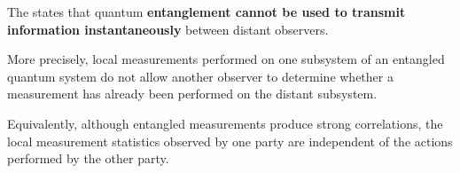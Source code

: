 \begin{definitionbox}
    The  states that quantum \textbf{entanglement cannot be used to transmit information instantaneously} between distant observers.

    \highspace
    More precisely, local measurements performed on one subsystem of an entangled quantum system do not allow another observer to determine whether a measurement has already been performed on the distant subsystem.

    \highspace
    Equivalently, although entangled measurements produce strong correlations, the local measurement statistics observed by one party are independent of the actions performed by the other party.
\end{definitionbox}

